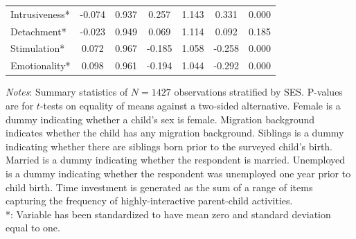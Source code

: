 \documentclass[notes, 12.5pt, aspectratio=169]{beamer}
\begin{document}
\begin{frame}[label=appendix_2]{}
{\begin{table}[!htbp]
\begin{threeparttable}
\begin{tabular}[t]{lcccccc}
				\hspace{5mm}Intrusiveness* & -0.074 & 0.937 & 0.257 & 1.143 & 0.331 & 0.000\\
				\hspace{5mm}Detachment* & -0.023 & 0.949 & 0.069 & 1.114 & 0.092 & 0.185\\
				\hspace{5mm}Stimulation* & 0.072 & 0.967 & -0.185 & 1.058 & -0.258 & 0.000\\
				\hspace{5mm}Emotionality* & 0.098 & 0.961 & -0.194 & 1.044 & -0.292 & 0.000\\
				\hline\hline
			\end{tabular}
			\begin{tablenotes}
				\tiny
				\item \textit{Notes}: Summary statistics of $N = 1427$ observations stratified by SES. P-values are for $t$-tests on equality of means against a two-sided alternative. Female is a dummy indicating whether a child's sex is female. Migration background indicates whether the child has any migration background. Siblings is a dummy indicating whether there are siblings born prior to the surveyed child's birth. Married is a dummy indicating whether the respondent is married. Unemployed is a dummy indicating whether the respondent was unemployed one year prior to child birth. Time investment is generated as the sum of a range of items capturing the frequency of highly-interactive parent-child activities.\\ *: Variable has been standardized to have mean zero and standard deviation equal to one.
			\end{tablenotes}
		\end{threeparttable}
	\end{table}
}
\end{frame}
%
\end{document}
